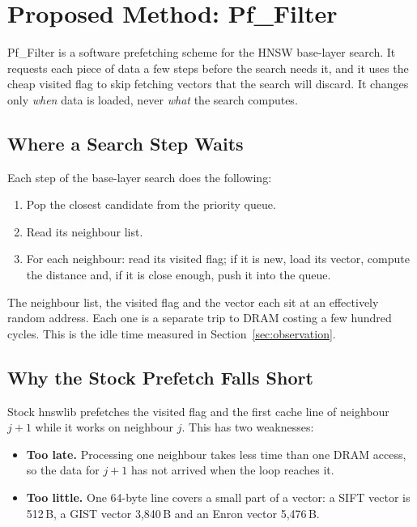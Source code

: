 
\section{Proposed Method: Pf\_Filter}
\label{sec:pf-filter}

Pf\_Filter is a software prefetching scheme for the HNSW base-layer search.
It requests each piece of data a few steps before the search needs it, and it
uses the cheap visited flag to skip fetching vectors that the search will discard.
It changes only \emph{when} data is loaded, never \emph{what} the search computes.

\subsection{Where a Search Step Waits}

Each step of the base-layer search does the following:
\begin{enumerate}
  \item Pop the closest candidate from the priority queue.
  \item Read its neighbour list.
  \item For each neighbour: read its visited flag; if it is new, load its vector,
        compute the distance and, if it is close enough, push it into the queue.
\end{enumerate}
The neighbour list, the visited flag and the vector each sit at an effectively
random address. Each one is a separate trip to DRAM costing a few hundred cycles.
This is the idle time measured in Section~\ref{sec:observation}.

\subsection{Why the Stock Prefetch Falls Short}

Stock hnswlib prefetches the visited flag and the first cache line of neighbour
$j+1$ while it works on neighbour $j$. This has two weaknesses:
\begin{itemize}
  \item \textbf{Too late.} Processing one neighbour takes less time than one DRAM
        access, so the data for $j+1$ has not arrived when the loop reaches it.
  \item \textbf{Too little.} One 64-byte line covers a small part of a vector:
        a SIFT vector is 512\,B, a GIST vector 3{,}840\,B and an Enron vector 5{,}476\,B.
\end{itemize}

